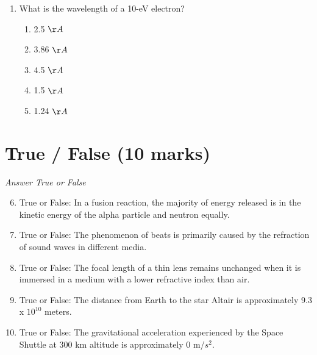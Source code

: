 \documentclass[12pt]{article}
\begin{document}
\begin{enumerate}[label=\arabic*.]
\begin{enumerate}[label=(\alph*)]
    \item rate of change of the magnetic flux through S
    \item electric flux through S
    \item rate of change of the electric current through S
    \item time integral of the magnetic flux through S
    \item rate of change of the electric flux through S
\end{enumerate}
\item What is the wavelength of a 10-eV electron?
\begin{enumerate}[label=(\alph*)]
    \item 2.5 \ensuremath{\AA}
    \item 3.86 \ensuremath{\AA}
    \item 4.5 \ensuremath{\AA}
    \item 1.5 \ensuremath{\AA}
    \item 1.24 \ensuremath{\AA}
\end{enumerate}
\end{enumerate}

\section*{True / False (10 marks)}
\textit{Answer True or False}
\begin{enumerate}[label=\arabic*.]
\setcounter{enumi}{5}
\item True or False: In a fusion reaction, the majority of energy released is in the kinetic energy of the alpha particle and neutron equally.
\item True or False: The phenomenon of beats is primarily caused by the refraction of sound waves in different media.
\item True or False: The focal length of a thin lens remains unchanged when it is immersed in a medium with a lower refractive index than air.
\item True or False: The distance from Earth to the star Altair is approximately 9.3 x $10^10$ meters.
\item True or False: The gravitational acceleration experienced by the Space Shuttle at 300 km altitude is approximately 0 m/$s^2$.
\end{enumerate}
\end{document}
